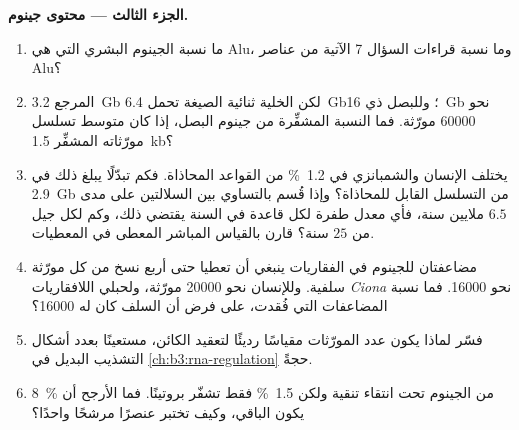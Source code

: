\begin{problem}
\medskip
\noindent\textbf{الجزء الثالث --- محتوى جينوم.}
\begin{enumerate}[resume]
  \item ما نسبة الجينوم البشري التي هي Alu، وما نسبة
        قراءات السؤال 7 الآتية من عناصر Alu؟
  \item المرجع \qty{3.2}{Gb} لكن الخلية ثنائية الصيغة تحمل
        \qty{6.4}{Gb}؛ وللبصل ذي \qty{16}{Gb} نحو \num{60000}
        مورّثة. فما النسبة المشفِّرة من جينوم البصل، إذا كان متوسط
        تسلسل مورّثاته المشفِّر \qty{1.5}{kb}؟
  \item يختلف الإنسان والشمبانزي في \qty{1.2}{\%} من القواعد المحاذاة.
        فكم تبدّلًا يبلغ ذلك في \qty{2.9}{Gb} من التسلسل القابل
        للمحاذاة؟ وإذا قُسم بالتساوي بين السلالتين على مدى $6.5$
        ملايين سنة، فأي معدل طفرة لكل قاعدة في السنة يقتضي ذلك،
        وكم لكل جيل من $25$ سنة؟ قارن بالقياس
        المباشر المعطى في المعطيات.
  \item مضاعفتان للجينوم في الفقاريات ينبغي أن تعطيا حتى أربع
        نسخ من كل مورّثة سلفية. وللإنسان نحو \num{20000}
        مورّثة، ولحبلي اللافقاريات \emph{Ciona} نحو
        \num{16000}. فما نسبة المضاعفات التي فُقدت، على
        فرض أن السلف كان له \num{16000}؟
  \item فسّر لماذا يكون عدد المورّثات مقياسًا رديئًا لتعقيد
        الكائن، مستعينًا بعدد أشكال التشذيب البديل في
        \cref{ch:b3:rna-regulation} حجةً.
  \item \qty{8}{\%} من الجينوم تحت انتقاء تنقية ولكن
        \qty{1.5}{\%} فقط تشفّر بروتينًا. فما الأرجح أن يكون
        الباقي، وكيف تختبر عنصرًا مرشحًا واحدًا؟
\end{enumerate}


\end{problem}

